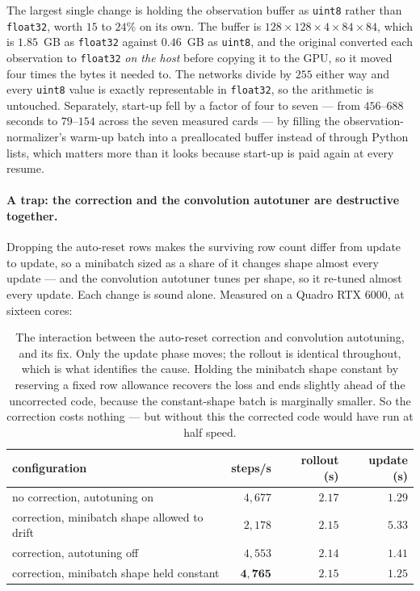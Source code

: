 The largest single change is holding the observation buffer as \texttt{uint8} rather than
\texttt{float32}, worth $15$ to $24\%$ on its own. The buffer is $128\times128\times4\times84\times84$,
which is $1.85$~GB as \texttt{float32} against $0.46$~GB as \texttt{uint8}, and the original converted
each observation to \texttt{float32} \emph{on the host} before copying it to the GPU, so it moved four
times the bytes it needed to. The networks divide by $255$ either way and every \texttt{uint8} value
is exactly representable in \texttt{float32}, so the arithmetic is untouched. Separately, start-up
fell by a factor of four to seven --- from $456$--$688$ seconds to $79$--$154$ across the seven
measured cards --- by filling the observation-normalizer's warm-up batch into a preallocated
buffer instead of through Python lists, which matters more than it looks because start-up is paid
again at every resume.

\paragraph{A trap: the correction and the convolution autotuner are destructive together.}
Dropping the auto-reset rows makes the surviving row count differ from update to update, so a
minibatch sized as a share of it changes shape almost every update --- and the convolution autotuner
tunes per shape, so it re-tuned almost every update. Each change is sound alone. Measured on a Quadro
RTX 6000, at sixteen cores:

\begin{table}[H]
\centering
\footnotesize
\setlength{\tabcolsep}{6pt}
\renewcommand{\arraystretch}{1.15}
\begin{tabular}{@{}lrrr@{}}
\toprule
\textbf{configuration} & \textbf{steps/s} & \textbf{rollout (s)} & \textbf{update (s)} \\
\midrule
no correction, autotuning on & $4{,}677$ & $2.17$ & $1.29$ \\
correction, minibatch shape allowed to drift & $2{,}178$ & $2.15$ & $5.33$ \\
correction, autotuning off & $4{,}553$ & $2.14$ & $1.41$ \\
correction, minibatch shape held constant & $\mathbf{4{,}765}$ & $2.15$ & $\mathbf{1.25}$ \\
\bottomrule
\end{tabular}
\caption{The interaction between the auto-reset correction and convolution autotuning, and its fix.
Only the update phase moves; the rollout is identical throughout, which is what identifies the cause.
Holding the minibatch shape constant by reserving a fixed row allowance recovers the loss and ends
slightly ahead of the uncorrected code, because the constant-shape batch is marginally smaller. So
the correction costs nothing --- but without this the corrected code would have run at half speed.}
\label{tab:cleanrl-shape}
\end{table}


